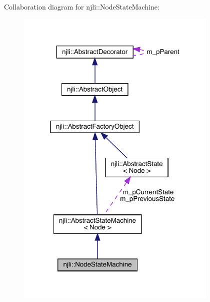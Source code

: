 Collaboration diagram for njli\+:\+:Node\+State\+Machine\+:\nopagebreak
\begin{figure}[H]
\begin{center}
\leavevmode
\includegraphics[width=273pt]{classnjli_1_1_node_state_machine__coll__graph}
\end{center}
\end{figure}
